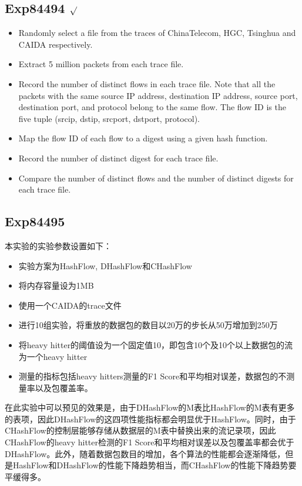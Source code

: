 \documentclass{article}
\begin{document}
\subsection{Exp84494 $\surd$}
\begin{itemize}
	\item Randomly select a file from the traces of ChinaTelecom, HGC, Tsinghua and CAIDA respectively. 
	\item Extract 5 million packets from each trace file.
	\item Record the number of distinct flows in each trace file. Note that all the packets with the same source IP address, destination IP address, source port, destination port, and protocol belong to the same flow. The flow ID is the five tuple (srcip, dstip, srcport, dstport, protocol).
	\item Map the flow ID of each flow to a digest using a given hash function.
	\item Record the number of distinct digest for each trace file. 
	\item Compare the number of distinct flows and the number of distinct digests for each trace file.
\end{itemize}

\subsection{Exp84495}
本实验的实验参数设置如下：
\begin{itemize}
\item 实验方案为HashFlow, DHashFlow和CHashFlow
\item 将内存容量设为1MB
\item 使用一个CAIDA的trace文件
\item 进行10组实验，将重放的数据包的数目以20万的步长从50万增加到250万
\item 将heavy hitter的阈值设为一个固定值10，即包含10个及10个以上数据包的流为一个heavy hitter
\item 测量的指标包括heavy hitters测量的F1 Score和平均相对误差，数据包的不测量率以及包覆盖率。
\end{itemize}

在此实验中可以预见的效果是，由于DHashFlow的M表比HashFlow的M表有更多的表项，因此DHashFlow的这四项性能指标都会明显优于HashFlow。同时，由于CHashFlow的控制层能够存储从数据层的M表中替换出来的流记录项，因此CHashFlow的heavy hitter检测的F1 Score和平均相对误差以及包覆盖率都会优于DHashFlow。此外，随着数据包数目的增加，各个算法的性能都会逐渐降低，但是HashFlow和DHashFlow的性能下降趋势相当，而CHashFlow的性能下降趋势要平缓得多。
\end{document}
